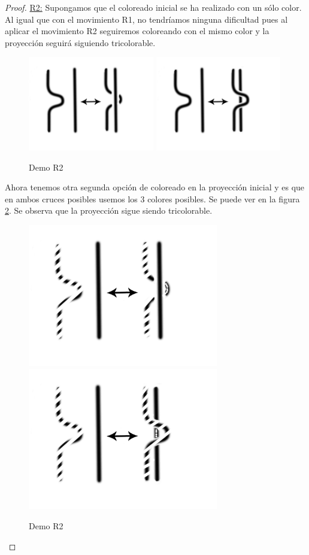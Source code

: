\begin{teo}
\begin{proof}
		\underline{R2:}
		Supongamos que el coloreado inicial se ha realizado con un sólo color. Al igual que con el movimiento R1, no tendríamos ninguna dificultad pues al aplicar el movimiento R2 seguiremos coloreando con el mismo color y la proyección seguirá siguiendo tricolorable. \\
		\begin{figure}[h!]
			\centering
			\includegraphics[width=5.5cm]{inudos/movi3.png}
			\includegraphics[width=5.5cm]{inudos/movi4.png}
			\caption{Demo R2}
			\label{demotri2} 
		\end{figure}
		
		Ahora tenemos otra segunda opción de coloreado en la proyección inicial y es que en ambos cruces posibles usemos los 3 colores posibles. Se puede ver en la figura \ref{demotri3}. Se observa que la proyección sigue siendo tricolorable. 
		\begin{figure}[h!]
			\centering
			\includegraphics[width=8.3cm]{inudos/movi3tri.png}
			\includegraphics[width=8.3cm]{inudos/movi4tri.png}
			\caption{Demo R2}
			\label{demotri3} 
		\end{figure}
		

\end{proof}
\end{teo}
